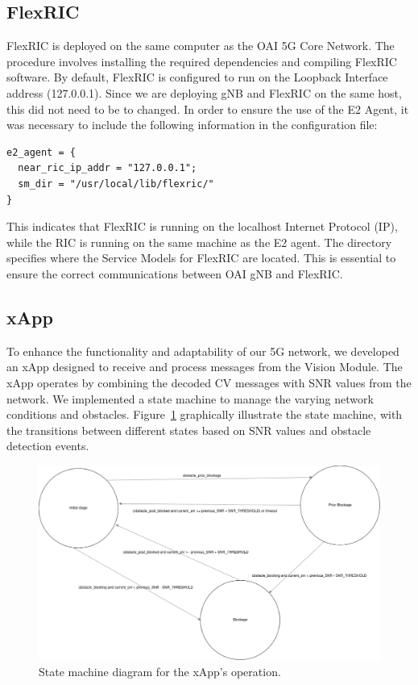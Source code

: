 \subsection{FlexRIC}\label{subsec:flexric}
FlexRIC is deployed on the same computer as the OAI 5G Core Network.
The procedure involves installing the required dependencies and compiling FlexRIC software.
By default, FlexRIC is configured to run on the Loopback Interface address (127.0.0.1).
Since we are deploying gNB and FlexRIC on the same host, this did not need to be to changed.
In order to ensure the use of the E2 Agent, it was necessary to include the following information in the configuration file:

\begin{verbatim}
e2_agent = {
  near_ric_ip_addr = "127.0.0.1";
  sm_dir = "/usr/local/lib/flexric/"
}
\end{verbatim}

This indicates that FlexRIC is running on the localhost Internet Protocol (IP), while the RIC is running on the same machine as the E2 agent.
The directory specifies where the Service Models for FlexRIC are located.
This is essential to ensure the correct communications between OAI gNB and FlexRIC\@.

\subsection{xApp}\label{subsec:xapp}
To enhance the functionality and adaptability of our 5G network, we developed an xApp designed to receive and process messages from the Vision Module.
The xApp operates by combining the decoded CV messages with SNR values from the network.
We implemented a state machine to manage the varying network conditions and obstacles.
Figure~\ref{fig:state_xapp} graphically illustrate the state machine, with the transitions between different states based on SNR values and obstacle detection events.

\begin{figure}[H]
    \centering
    \includegraphics[width=0.8\linewidth]{figures/State_machine.drawio}
    \caption{State machine diagram for the xApp's operation.}
    \label{fig:state_xapp}
\end{figure}


